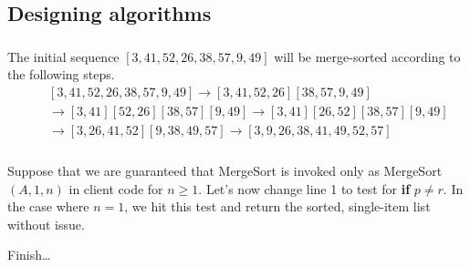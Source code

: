 \subsection{Designing algorithms}

\subsubsection{}
    The initial sequence $[3, 41, 52, 26, 38, 57, 9, 49]$ will be merge-sorted according to the following steps.
    \begin{eqnarray}
        \nonumber &\,& [3, 41, 52, 26, 38, 57, 9, 49] \to 
            [3, 41, 52, 26] [38, 57, 9, 49]
        \\ \nonumber &\,& \to
        [3, 41] [52, 26] [38, 57] [9, 49] \to
        [3, 41] [26, 52] [38, 57] [9, 49]
        \\ \nonumber &\,& \to
        [3, 26, 41, 52] [9, 38, 49, 57] \to
        [3, 9, 26, 38, 41, 49, 52, 57]
    \end{eqnarray}

\subsubsection{}
    Suppose that we are guaranteed that MergeSort is invoked only as MergeSort$(A, 1, n)$ in client code for $n\ge1$.  Let's now change line 1 to test for {\bf if }$p \neq r$.  In the case where $n=1$, we hit this test and return the sorted, single-item list without issue.

    Finish\ldots